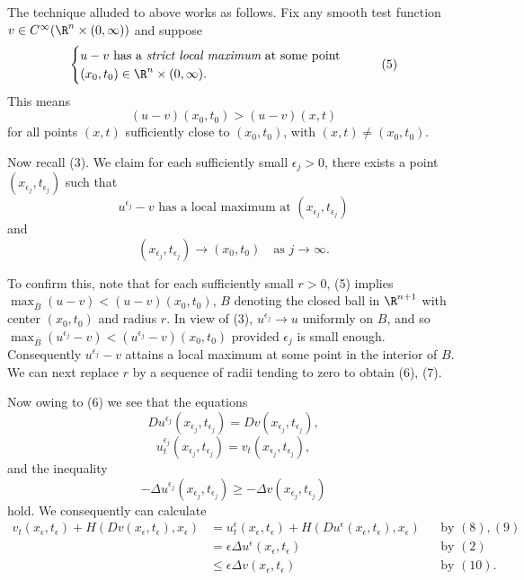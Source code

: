 \begin{remark}
\label{rem:hj-viscosity-solution-motivation}
The technique alluded to above works as follows. Fix any smooth test function $v \in C^\infty(\R^n \times (0,\infty))$ and suppose
\[
\begin{cases} u - v \text{ has a } \textit{strict local maximum} \text{ at some point} \\ (x_0, t_0) \in \R^n \times (0,\infty). \end{cases}
\tag{5}
\]
This means
\[
(u-v)(x_0, t_0) > (u-v)(x,t)
\]
for all points $(x,t)$ sufficiently close to $(x_0, t_0)$, with $(x,t) \neq (x_0, t_0)$.

Now recall (3). We claim for each sufficiently small $\epsilon_j > 0$, there exists a point $(x_{\epsilon_j}, t_{\epsilon_j})$ such that
\[
u^{\epsilon_j} - v \text{ has a local maximum at } (x_{\epsilon_j}, t_{\epsilon_j})
\tag{6}
\]
and
\[
(x_{\epsilon_j}, t_{\epsilon_j}) \to (x_0, t_0) \quad \text{as } j \to \infty.
\tag{7}
\]

To confirm this, note that for each sufficiently small $r > 0$, (5) implies $\max_{\overline{B}}(u-v) < (u-v)(x_0, t_0)$, $B$ denoting the closed ball in $\R^{n+1}$ with center $(x_0, t_0)$ and radius $r$. In view of (3), $u^{\epsilon_j} \to u$ uniformly on $B$, and so $\max_{\overline{B}}(u^{\epsilon_j}-v) < (u^{\epsilon_j}-v)(x_0, t_0)$ provided $\epsilon_j$ is small enough. Consequently $u^{\epsilon_j} - v$ attains a local maximum at some point in the interior of $B$. We can next replace $r$ by a sequence of radii tending to zero to obtain (6), (7).

Now owing to (6) we see that the equations
\[
Du^{\epsilon_j}(x_{\epsilon_j}, t_{\epsilon_j}) = Dv(x_{\epsilon_j}, t_{\epsilon_j}),
\tag{8}
\]
\[
u_t^{\epsilon_j}(x_{\epsilon_j}, t_{\epsilon_j}) = v_t(x_{\epsilon_j}, t_{\epsilon_j}),
\tag{9}
\]
and the inequality
\[
-\Delta u^{\epsilon_j}(x_{\epsilon_j}, t_{\epsilon_j}) \geq -\Delta v(x_{\epsilon_j}, t_{\epsilon_j})
\tag{10}
\]
hold. We consequently can calculate
\[
\begin{aligned}
v_t(x_\epsilon, t_\epsilon) + H(Dv(x_\epsilon, t_\epsilon), x_\epsilon)
&= u_t^\epsilon(x_\epsilon, t_\epsilon) + H(Du^\epsilon(x_\epsilon, t_\epsilon), x_\epsilon) && \text{by }(8),(9) \\
&= \epsilon \Delta u^\epsilon(x_\epsilon, t_\epsilon) && \text{by }(2) \\
&\leq \epsilon \Delta v(x_\epsilon, t_\epsilon) && \text{by }(10).
\end{aligned}
\tag{11}
\]


\end{remark}
